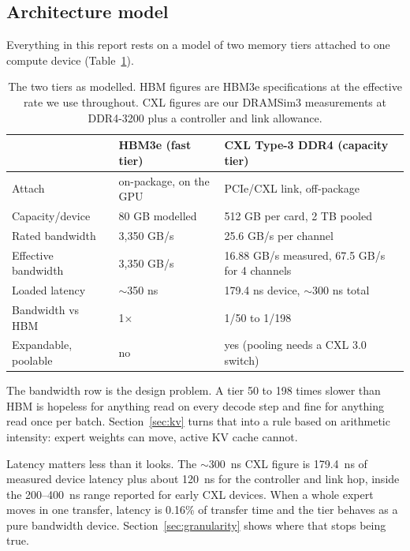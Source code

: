 \documentclass[10pt,a4paper]{article}
\begin{document}
\subsection{Architecture model}

Everything in this report rests on a model of two memory tiers attached to one
compute device (Table~\ref{tab:archmodel}).

\begin{table}[htbp]
\centering\small
\caption{The two tiers as modelled. HBM figures are HBM3e specifications at the
effective rate we use throughout. CXL figures are our DRAMSim3 measurements at
DDR4-3200 plus a controller and link allowance.}
\label{tab:archmodel}
\begin{tabular}{lll}
\toprule
 & HBM3e (fast tier) & CXL Type-3 DDR4 (capacity tier) \\
\midrule
Attach            & on-package, on the GPU  & PCIe/CXL link, off-package \\
Capacity/device   & 80 GB modelled          & 512 GB per card, 2 TB pooled \\
Rated bandwidth   & 3{,}350 GB/s            & 25.6 GB/s per channel \\
Effective bandwidth & 3{,}350 GB/s          & 16.88 GB/s measured, 67.5 GB/s for 4 channels \\
Loaded latency    & $\sim$350 ns            & 179.4 ns device, $\sim$300 ns total \\
Bandwidth vs HBM  & 1$\times$               & 1/50 to 1/198 \\
Expandable, poolable & no                   & yes (pooling needs a CXL 3.0 switch) \\
\bottomrule
\end{tabular}
\end{table}

The bandwidth row is the design problem. A tier 50 to 198 times slower than HBM
is hopeless for anything read on every decode step and fine for anything read
once per batch. Section~\ref{sec:kv} turns that into a rule based on arithmetic
intensity: expert weights can move, active KV cache cannot.

Latency matters less than it looks. The $\sim$300~ns CXL figure is 179.4~ns of
measured device latency plus about 120~ns for the controller and link hop, inside
the 200--400~ns range reported for early CXL devices. When a whole expert moves
in one transfer, latency is 0.16\% of transfer time and the tier behaves as a
pure bandwidth device. Section~\ref{sec:granularity} shows where that stops being
true.
\end{document}
